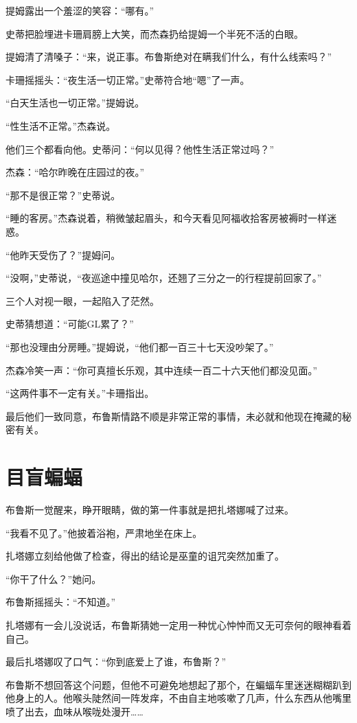 \documentclass[../main.tex]{subfiles}
\begin{document}
提姆露出一个羞涩的笑容：“哪有。”

史蒂把脸埋进卡珊肩膀上大笑，而杰森扔给提姆一个半死不活的白眼。

提姆清了清嗓子：“来，说正事。布鲁斯绝对在瞒我们什么，有什么线索吗？”

卡珊摇摇头：“夜生活一切正常。”史蒂符合地“嗯”了一声。

“白天生活也一切正常。”提姆说。

“性生活不正常。”杰森说。

他们三个都看向他。史蒂问：“何以见得？他性生活正常过吗？”

杰森：“哈尔昨晚在庄园过的夜。”

“那不是很正常？”史蒂说。

“睡的客房。”杰森说着，稍微皱起眉头，和今天看见阿福收拾客房被褥时一样迷惑。

“他昨天受伤了？”提姆问。

“没啊，”史蒂说，“夜巡途中撞见哈尔，还翘了三分之一的行程提前回家了。”

三个人对视一眼，一起陷入了茫然。

史蒂猜想道：“可能GL累了？”

“那也没理由分房睡。”提姆说，“他们都一百三十七天没吵架了。”

杰森冷笑一声：“你可真擅长乐观，其中连续一百二十六天他们都没见面。”

“这两件事不一定有关。”卡珊指出。

最后他们一致同意，布鲁斯情路不顺是非常正常的事情，未必就和他现在掩藏的秘密有关。

\section{目盲蝙蝠}

布鲁斯一觉醒来，睁开眼睛，做的第一件事就是把扎塔娜喊了过来。

“我看不见了。”他披着浴袍，严肃地坐在床上。

扎塔娜立刻给他做了检查，得出的结论是巫童的诅咒突然加重了。

“你干了什么？”她问。

布鲁斯摇摇头：“不知道。”

扎塔娜有一会儿没说话，布鲁斯猜她一定用一种忧心忡忡而又无可奈何的眼神看着自己。

最后扎塔娜叹了口气：“你到底爱上了谁，布鲁斯？”

布鲁斯不想回答这个问题，但他不可避免地想起了那个，在蝙蝠车里迷迷糊糊趴到他身上的人。他喉头陡然间一阵发痒，不由自主地咳嗽了几声，什么东西从他嘴里喷了出去，血味从喉咙处漫开……
\end{document}
